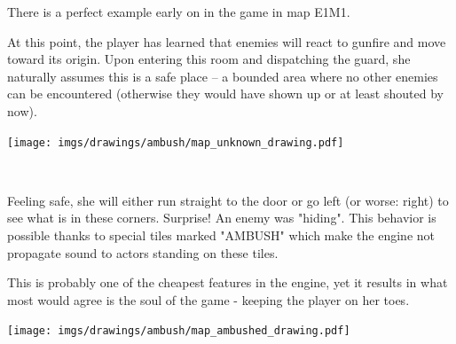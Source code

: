 \par
\begin{minipage}{1\textwidth}
\begin{figure}[H]
 \centering
\end{figure}
\par


  \begin{minipage}{0.6\textwidth}
  There is a perfect example early on in the game in map E1M1.\\
  \par At this point, the player has learned that enemies will react to gunfire and move toward its origin. Upon entering this room and dispatching the guard, she naturally assumes this is a safe place -- a bounded area where no other enemies can be encountered (otherwise they would have shown up or at least shouted by now).
  \end{minipage}
  \begin{minipage}{0.4\textwidth}
  \begin{flushright}
  \texttt{[image: imgs/drawings/ambush/map\_unknown\_drawing.pdf]}
  \end{flushright}  
  \end{minipage}
\end{minipage}
\noindent
\\


\par
\begin{minipage}{1\textwidth}
  \begin{figure}[H]
   \centering
  \end{figure}
  \par
  \begin{minipage}{0.6\textwidth}
  Feeling safe, she will either run straight to the door or go left (or worse: right) to see what is in these corners. Surprise! An enemy was "hiding". This behavior is possible thanks to special tiles marked "AMBUSH" which make the engine not propagate sound to actors standing on these tiles.\\
  \par
   This is probably one of the cheapest features in the engine, yet it results in what most would agree is the soul of the game - keeping the player on her toes.
  \end{minipage}
  \begin{minipage}{0.4\textwidth}
  \begin{flushright}
  \texttt{[image: imgs/drawings/ambush/map\_ambushed\_drawing.pdf]}
  \end{flushright}
  \end{minipage}
\end{minipage}


